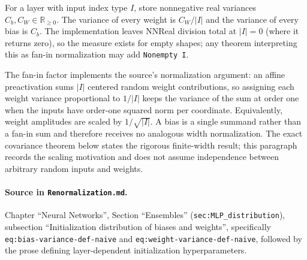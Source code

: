 \begin{definition}
\label{def:renorm:initHyperparams}
For a layer with input index type $I$, store nonnegative real variances
$C_b,C_W\in\mathbb R_{\ge0}$.  The variance of every weight is $C_W/|I|$ and the variance of every
bias is $C_b$.  The implementation leaves NNReal division total at $|I|=0$ (where it returns zero),
so the measure exists for empty shapes; any theorem interpreting this as fan-in normalization may
add \texttt{Nonempty I}.

The fan-in factor implements the source's normalization argument: an affine preactivation sums
$|I|$ centered random weight contributions, so assigning each weight variance proportional to
$1/|I|$ keeps the variance of the sum at order one when the inputs have order-one squared norm per
coordinate.  Equivalently, weight amplitudes are scaled by $1/\sqrt{|I|}$.  A bias is a single
summand rather than a fan-in sum and therefore receives no analogous width normalization.  The
exact covariance theorem below states the rigorous finite-width result; this paragraph records
the scaling motivation and does not assume independence between arbitrary random inputs and
weights.

\paragraph{Source in \texttt{Renormalization.md}.}
Chapter ``Neural Networks'', Section ``Ensembles'' (\texttt{sec:MLP\_distribution}), subsection
``Initialization distribution of biases and weights'', specifically
\texttt{eq:bias-variance-def-naive} and \texttt{eq:weight-variance-def-naive}, followed by the prose
defining layer-dependent initialization hyperparameters.
\end{definition}

